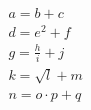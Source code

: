 \documentclass{article}
\begin{document}
\[
\begin{aligned}
    &a = b + c \\
    &d = e^2 + f \\
    &g = \frac{h}{i} + j \\
    &k = \sqrt{l} + m \\
    &n = o \cdot p + q
\end{aligned}
\]
\end{document}
